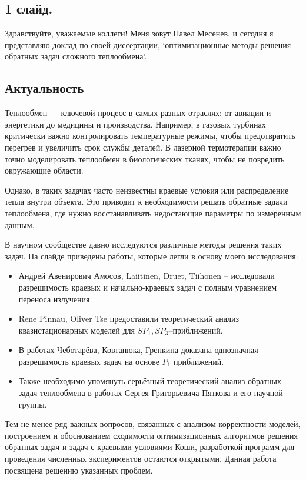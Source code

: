 \documentclass[8pt,a4paper]{article}
\author{Mesenev}
\date{\today}
\begin{document}
    \subsection*{1 слайд.}
    Здравствуйте, уважаемые коллеги!
    Меня зовут Павел Месенев, и сегодня я представляю доклад по своей диссертации,
    `оптимизационные методы решения обратных задач сложного теплообмена'.

    \subsection*{Актуальность}

    Теплообмен — ключевой процесс в самых разных отраслях: от авиации и энергетики до медицины и производства.
    Например, в газовых турбинах критически важно контролировать температурные режимы,
    чтобы предотвратить перегрев и увеличить срок службы деталей.
    В лазерной термотерапии важно точно моделировать теплообмен в биологических тканях,
    чтобы не повредить окружающие области.

    Однако, в таких задачах часто неизвестны краевые условия или распределение тепла внутри объекта.
    Это приводит к необходимости решать обратные задачи теплообмена,
    где нужно восстанавливать недостающие параметры по измеренным данным.

    В научном сообществе давно исследуются различные методы решения таких задач.
    На слайде приведены работы, которые легли в основу моего исследования:
    \begin{itemize}
        \item Андрей Авенирович Амосов, Laiitinen, Druet, Tiihonen -- исследовали разрешимость краевых и начально-краевых задач с полным уравнением переноса излучения.
        \item Rene Pinnau, Oliver Tse предоставили теоретический анализ квазистационарных моделей для $SP_1, SP_3$--приближений.
        \item В работах Чеботарёва, Ковтанюка, Гренкина доказана однозначная разрешимость краевых задач на основе $P_1$ приближений.
        \item Также необходимо упомянуть серьёзный теоретический анализ обратных задач теплообмена в работах Сергея Григорьевича Пяткова и его научной группы.
    \end{itemize}

    Тем не менее ряд важных вопросов, связанных с анализом корректности моделей,
    построением и обоснованием сходимости оптимизационных алгоритмов
    решения обратных задач и задач с краевыми условиями Коши,
    разработкой программ для проведения численных экспериментов остаются открытыми.
    Данная работа посвящена решению указанных проблем.
\end{document}
